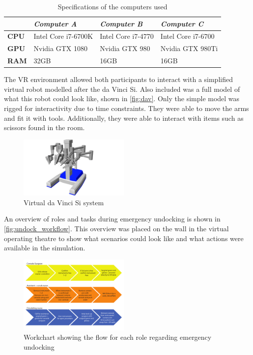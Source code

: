 \documentclass[conference]{IEEEtran}
\begin{document}
\begin{table}
\centering
\begin{tabularx}{0.48\textwidth}{X X X X}
\toprule
                     & \textit{Computer A} & \textit{Computer B} & \textit{Computer C} \\ \midrule \rowcolor{lightGrey}
\textbf{CPU}         & Intel Core i7-6700K & Intel Core i7-4770  & Intel Core i7-6700  \\

\textbf{GPU}         & Nvidia GTX 1080     & Nvidia GTX 980      & Nvidia GTX 980Ti    \\  \rowcolor{lightGrey}

\textbf{RAM} 		 & 32GB                & 16GB                & 16GB                 \\ \toprule
\end{tabularx}
\caption{Specifications of the computers used}
\label{tab:specs}
\end{table}

The VR environment allowed both participants to interact with a simplified virtual robot modelled after the da Vinci Si. Also included was a full model of what this robot could look like, shown in \autoref{fig:dav}. Only the simple model was rigged for interactivity due to time constraints. They were able to move the arms and fit it with tools. Additionally, they were able to interact with items such as scissors found in the room.

\begin{figure}
\centering
\includegraphics[width=0.48\textwidth]{Figures/TempRender.png}
\caption{Virtual da Vinci Si system}
\label{fig:dav}
\end{figure}

An overview of roles and tasks during emergency undocking is shown in \autoref{fig:undock_workflow}. This overview was placed on the wall in the virtual operating theatre to show what scenarios could look like and what actions were available in the simulation.

\begin{figure}[h]
	\centering
	\includegraphics[width=0.48\textwidth]{figures/workflow_chart}
	\caption{Workchart showing the flow for each role regarding emergency undocking}
	\label{fig:undock_workflow}
\end{figure}
\end{document}
